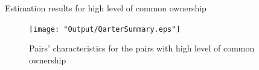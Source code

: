 			{\begin{table}[htbp]
					\centering
					\caption{\scriptsize Estimation results for high level of common ownership}
					\label{QTimemresult2subsample}
					{
						
					}
			\end{table}}
			
			\begin{figure}[htbp]
				\centering  
				\texttt{[image: "Output/QarterSummary.eps"]}
				\caption{Pairs' characteristics for the pairs with high level of common ownership}
				\label{QarterSummary}
			\end{figure}
			
		
